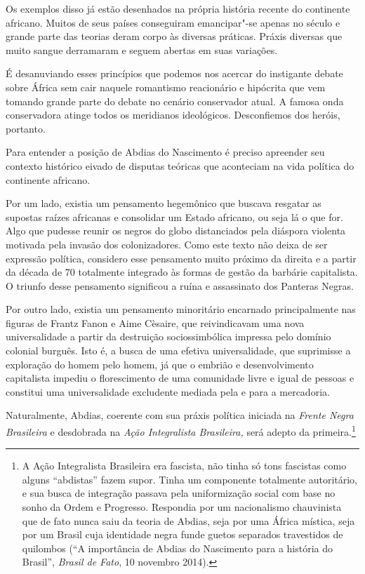 Os exemplos disso já estão desenhados na própria história recente do
continente africano. Muitos de seus países conseguiram emancipar"-se
apenas no século  e grande parte das teorias deram corpo às diversas
práticas. Práxis diversas que muito sangue derramaram e seguem abertas
em suas variações.

É desanuviando esses princípios que podemos nos acercar do instigante
debate sobre África sem cair naquele romantismo reacionário e hipócrita
que vem tomando grande parte do debate no cenário conservador atual. A
famosa onda conservadora atinge todos os meridianos ideológicos. Desconfiemos dos heróis, portanto.

Para entender a posição de Abdias do Nascimento é preciso apreender seu
contexto histórico eivado de disputas teóricas que aconteciam na vida
política do continente africano.

Por um lado, existia um pensamento hegemônico que buscava resgatar as
supostas raízes africanas e consolidar um Estado africano, ou seja lá o
que for. Algo que pudesse reunir os negros do globo distanciados pela
diáspora violenta motivada pela invasão dos colonizadores. Como este
texto não deixa de ser expressão política, considero esse pensamento
muito próximo da direita e a partir da década de 70 totalmente integrado
às formas de gestão da barbárie capitalista. O triunfo desse pensamento
significou a ruína e assassinato dos Panteras Negras.

Por outro lado, existia um pensamento minoritário encarnado
principalmente nas figuras de Frantz Fanon e Aime Cèsaire, que
reivindicavam uma nova universalidade a partir da destruição
sociossimbólica impressa pelo domínio colonial burguês. Isto é, a busca
de uma efetiva universalidade, que suprimisse a exploração do homem pelo
homem, já que o embrião e desenvolvimento capitalista impediu o
florescimento de uma comunidade livre e igual de pessoas e constitui uma
universalidade excludente mediada pela e para a mercadoria.

Naturalmente, Abdias, coerente com sua práxis política iniciada na
\emph{Frente Negra Brasileira} e desdobrada na \emph{Ação Integralista
Brasileira,} será adepto da primeira.\footnote{A Ação Integralista
  Brasileira era fascista, não tinha só tons fascistas como alguns
  ``abdistas'' fazem supor. Tinha um componente totalmente autoritário,
  e sua busca de integração passava pela uniformização social com base
  no sonho da Ordem e Progresso. Respondia por um nacionalismo
  chauvinista que de fato nunca saiu da teoria de Abdias, seja por uma
  África mística, seja por um Brasil cuja identidade negra funde guetos
  separados travestidos de quilombos (``A importância de Abdias do
      Nascimento para a história do Brasil'', \emph{Brasil de Fato}, 10
  novembro 2014).}

